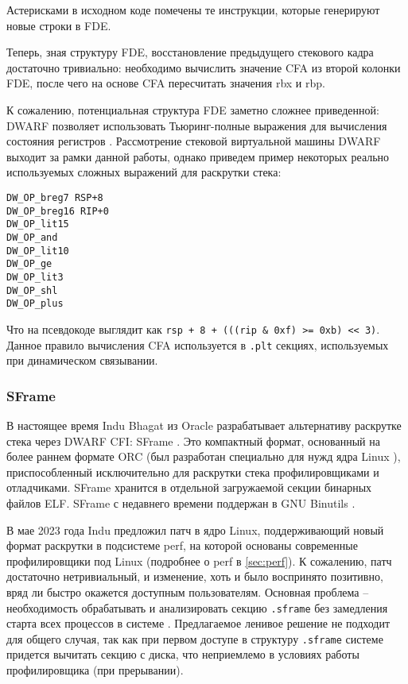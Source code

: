 Астерисками в исходном коде помечены те инструкции, которые генерируют новые строки в FDE.

Теперь, зная структуру FDE, восстановление предыдущего стекового кадра достаточно тривиально:
необходимо вычислить значение CFA из второй колонки FDE, после чего на основе CFA пересчитать значения rbx и rbp.

К сожалению, потенциальная структура FDE заметно сложнее приведенной:
DWARF позволяет использовать Тьюринг-полные выражения для вычисления состояния регистров \cite{dwarf:turingcomplete}.
Рассмотрение стековой виртуальной машины DWARF выходит за рамки данной работы,
однако приведем пример некоторых реально используемых сложных выражений для раскрутки стека:
\begin{verbatim}
DW_OP_breg7 RSP+8
DW_OP_breg16 RIP+0
DW_OP_lit15
DW_OP_and
DW_OP_lit10
DW_OP_ge
DW_OP_lit3
DW_OP_shl
DW_OP_plus
\end{verbatim}
Что на псевдокоде выглядит как \verb!rsp + 8 + (((rip & 0xf) >= 0xb) << 3)!.
Данное правило вычисления CFA используется в \verb!.plt! секциях, используемых при динамическом связывании.

\subsubsection{SFrame}
В настоящее время Indu Bhagat из Oracle разрабатывает альтернативу раскрутке стека
через DWARF CFI: SFrame \cite{sframe:phoronix, sframe:lwn}.
Это компактный формат, основанный на более раннем формате ORC (был разработан специально для нужд ядра Linux \cite{orc}),
приспособленный исключительно для раскрутки стека профилировщиками и отладчиками.
SFrame хранится в отдельной загружаемой секции бинарных файлов ELF.
SFrame с недавнего времени поддержан в GNU Binutils \cite{sframe:commits}.

В мае 2023 года Indu предложил патч в ядро Linux, поддерживающий новый формат раскрутки в подсистеме perf, на которой
основаны современные профилировщики под Linux (подробнее о perf в \ref{sec:perf}).
К сожалению, патч достаточно нетривиальный, и изменение, хоть и было воспринято позитивно, вряд ли быстро окажется доступным пользователям.
Основная проблема – необходимость обрабатывать и анализировать секцию \lstinline!.sframe! без замедления
старта всех процессов в системе \cite{sframe:ml}. Предлагаемое ленивое решение не подходит для общего случая, так как при первом доступе в
структуру \lstinline!.sframe! системе придется вычитать секцию с диска, что неприемлемо в условиях работы профилировщика (при прерывании).

